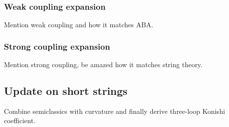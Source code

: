 \subsubsection{Weak coupling expansion}

Mention weak coupling and how it matches ABA.

\subsubsection{Strong coupling expansion}

Mention strong coupling, be amazed how it matches string theory.

\subsection{Update on short strings}

Combine semiclassics with curvature and finally derive three-loop Konishi coefficient.
